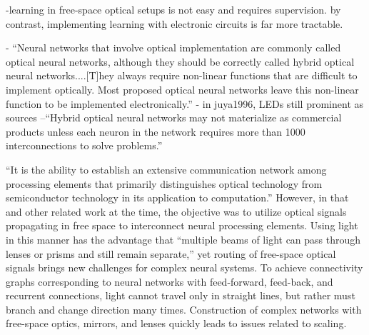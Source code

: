 -learning in free-space optical setups is not easy and requires supervision. by contrast, implementing learning with electronic circuits is far more tractable.

-\cite{juya1996} ``Neural networks that involve optical implementation are commonly called optical neural networks, although they should be correctly called hybrid optical neural networks....[T]hey always require non-linear functions that are difficult to implement optically. Most proposed optical neural networks leave this non-linear function to be implemented electronically.''
- in juya1996, LEDs still prominent as sources \cite{juya1996}
--``Hybrid optical neural networks may not materialize as commercial products unless each neuron in the network requires more than 1000 interconnections to solve problems.'' \cite{juya1996}

\vspace{3em}
\cite{abps1987}
``It is the ability to establish an extensive communication network among processing elements that primarily distinguishes optical technology from semiconductor technology in its application to computation.'' \cite{abps1987} However, in that and other related work at the time, the objective was to utilize optical signals propagating in free space to interconnect neural processing elements. Using light in this manner has the advantage that ``multiple beams of light can pass through lenses or prisms and still remain separate,'' \cite{abps1987} yet routing of free-space optical signals brings new challenges for complex neural systems. To achieve connectivity graphs corresponding to neural networks with feed-forward, feed-back, and recurrent connections, light cannot travel only in straight lines, but rather must branch and change direction many times. Construction of complex networks with free-space optics, mirrors, and lenses quickly leads to issues related to scaling. 






